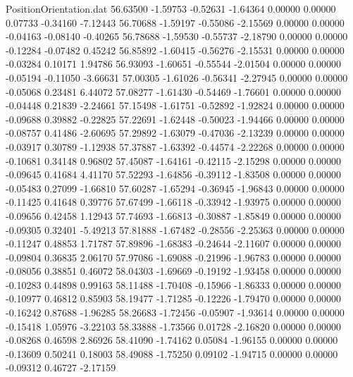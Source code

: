 \begin{filecontents}{PositionOrientation.dat}
  56.63500   -1.59753   -0.52631    -1.64364    0.00000    0.00000    0.07733   -0.34160   -7.12443
  56.70688   -1.59197   -0.55086    -2.15569    0.00000    0.00000   -0.04163   -0.08140   -0.40265
  56.78688   -1.59530   -0.55737    -2.18790    0.00000    0.00000   -0.12284   -0.07482    0.45242
  56.85892   -1.60415   -0.56276    -2.15531    0.00000    0.00000   -0.03284    0.10171    1.94786
  56.93093   -1.60651   -0.55544    -2.01504    0.00000    0.00000   -0.05194   -0.11050   -3.66631
  57.00305   -1.61026   -0.56341    -2.27945    0.00000    0.00000   -0.05068    0.23481    6.44072
  57.08277   -1.61430   -0.54469    -1.76601    0.00000    0.00000   -0.04448    0.21839   -2.24661
  57.15498   -1.61751   -0.52892    -1.92824    0.00000    0.00000   -0.09688    0.39882   -0.22825
  57.22691   -1.62448   -0.50023    -1.94466    0.00000    0.00000   -0.08757    0.41486   -2.60695
  57.29892   -1.63079   -0.47036    -2.13239    0.00000    0.00000   -0.03917    0.30789   -1.12938
  57.37887   -1.63392   -0.44574    -2.22268    0.00000    0.00000   -0.10681    0.34148    0.96802
  57.45087   -1.64161   -0.42115    -2.15298    0.00000    0.00000   -0.09645    0.41684    4.41170
  57.52293   -1.64856   -0.39112    -1.83508    0.00000    0.00000   -0.05483    0.27099   -1.66810
  57.60287   -1.65294   -0.36945    -1.96843    0.00000    0.00000   -0.11425    0.41648    0.39776
  57.67499   -1.66118   -0.33942    -1.93975    0.00000    0.00000   -0.09656    0.42458    1.12943
  57.74693   -1.66813   -0.30887    -1.85849    0.00000    0.00000   -0.09305    0.32401   -5.49213
  57.81888   -1.67482   -0.28556    -2.25363    0.00000    0.00000   -0.11247    0.48853    1.71787
  57.89896   -1.68383   -0.24644    -2.11607    0.00000    0.00000   -0.09804    0.36835    2.06170
  57.97086   -1.69088   -0.21996    -1.96783    0.00000    0.00000   -0.08056    0.38851    0.46072
  58.04303   -1.69669   -0.19192    -1.93458    0.00000    0.00000   -0.10283    0.44898    0.99163
  58.11488   -1.70408   -0.15966    -1.86333    0.00000    0.00000   -0.10977    0.46812    0.85903
  58.19477   -1.71285   -0.12226    -1.79470    0.00000    0.00000   -0.16242    0.87688   -1.96285
  58.26683   -1.72456   -0.05907    -1.93614    0.00000    0.00000   -0.15418    1.05976   -3.22103
  58.33888   -1.73566    0.01728    -2.16820    0.00000    0.00000   -0.08268    0.46598    2.86926
  58.41090   -1.74162    0.05084    -1.96155    0.00000    0.00000   -0.13609    0.50241    0.18003
  58.49088   -1.75250    0.09102    -1.94715    0.00000    0.00000   -0.09312    0.46727   -2.17159

\end{filecontents}
